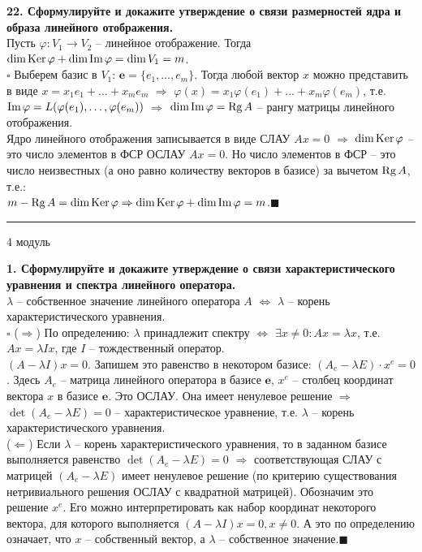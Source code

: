 \documentclass[11pt,a4paper]{article}
\newcommand{\e}{\mathbf{e}}
\newcommand{\Rg}[1]{\mathrm{Rg}\hspace{0.5mm}#1}
\newcommand{\Ker}[1]{\mathrm{Ker}\hspace{0.5mm}#1}
\renewcommand{\Im}[1]{\mathrm{Im}\hspace{0.5mm}#1}
\newcommand{\Dim}[1]{\mathrm{dim}\hspace{0.5mm}#1}
\newcommand{\proof}{$\square$ }
\newcommand{\qed}{\hfill$\blacksquare$}
\begin{document}
\textbf{22. Сформулируйте и докажите утверждение о связи размерностей ядра и образа линейного отображения.\\}
Пусть $\varphi : V_1 \rightarrow V_2$ -- линейное отображение. Тогда $\Dim{\Ker{\varphi}} + \Dim{\Im{\varphi}} = \Dim{V_1} = m$.\\
\proof Выберем базис в $V_1$: $\e = \{e_1, \hdots, e_m\}$. Тогда любой вектор $x$ можно представить в виде $x = x_1 e_1 + \hdots + x_m e_m$ $\Rightarrow$ $\varphi (x) = x_1 \varphi(e_1) + \hdots + x_m \varphi(e_m)$, т.е. $\Im{\varphi} = L(\varphi(e_1), \hdots, \varphi(e_m))$ $\Rightarrow$ $\Dim{\Im{\varphi}} = \Rg{A}$ -- рангу матрицы линейного отображения.\\
Ядро линейного отображения записывается в виде СЛАУ $Ax = 0$ $\Rightarrow$ $\Dim{\Ker{\varphi}}$ -- это число элементов в ФСР ОСЛАУ $Ax = 0$. Но число элементов в ФСР -- это число неизвестных (а оно равно количеству векторов в базисе) за вычетом $\Rg{A}$, т.е.:\\
$m - \Rg{A} = \Dim{\Ker{\varphi}} \Rightarrow \Dim{\Ker{\varphi}} + \Dim{\Im{\varphi}} = m$.\qed

\rule{\linewidth}{0.3mm}

\vspace{1mm}
\begin{center}
\begin{LARGE}
\textsf{4 модуль}
\end{LARGE}
\end{center}
\vspace{1mm}

\textbf{1. Сформулируйте и докажите утверждение о связи характеристического уравнения и спектра линейного оператора.\\}
$\lambda$ -- собственное значение линейного оператора $A$ $\Leftrightarrow$ $\lambda$ -- корень характеристического уравнения.\\
\proof ($\Rightarrow$) По определению: $\lambda$ принадлежит спектру $\Leftrightarrow$ $\exists x \neq 0 : Ax = \lambda x$, т.е. $Ax = \lambda I x$, где $I$ -- тождественный оператор.\\
$(A - \lambda I) x = 0$. Запишем это равенство в некотором базисе: $(A_e - \lambda E) \cdot x^e = 0$. Здесь $A_e$ -- матрица линейного оператора в базисе $\e$, $x^e$ -- столбец координат вектора $x$ в базисе $\e$. Это ОСЛАУ. Она имеет ненулевое решение $\Rightarrow$ $\det (A_e - \lambda E) = 0$ -- характеристическое уравнение, т.е. $\lambda$ -- корень характеристического уравнения.\\
($\Leftarrow$) Если $\lambda$ -- корень характеристического уравнения, то в заданном базисе выполняется равенство $\det (A_e - \lambda E) = 0$ $\Rightarrow$ соответствующая СЛАУ с матрицей $(A_e - \lambda E)$ имеет ненулевое решение (по критерию существования нетривиального решения ОСЛАУ с квадратной матрицей). Обозначим это решение $x^e$. Его можно интерпретировать как набор координат некоторого вектора, для которого выполняется $(A - \lambda I)x = 0, x \neq 0$. А это по определению означает, что $x$ -- собственный вектор, а $\lambda$ -- собственное значение.\qed
\end{document}
